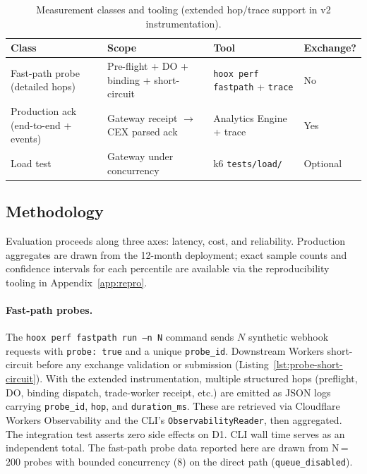 \begin{table}[t]
  \centering
  \caption{Measurement classes and tooling (extended hop/trace support in v2 instrumentation).}
  \label{tab:measurement-taxonomy}
  \small
  \begin{tabular*}{\linewidth}{@{\extracolsep{\fill}}llll@{}}
    \toprule
    \textbf{Class} & \textbf{Scope} & \textbf{Tool} & \textbf{Exchange?} \\
    \midrule
    Fast-path probe (detailed hops) & Pre-flight + DO + binding + short-circuit & \texttt{hoox perf fastpath} + \texttt{trace} & No \\
    Production ack (end-to-end + events) & Gateway receipt $\rightarrow$ CEX parsed ack & Analytics Engine + trace & Yes \\
    Load test & Gateway under concurrency & k6 \texttt{tests/load/} & Optional \\
    \bottomrule
  \end{tabular*}
\end{table}

\subsection{Methodology}

Evaluation proceeds along three axes: latency, cost, and reliability. Production aggregates are drawn from the 12-month deployment; exact sample counts and confidence intervals for each percentile are available via the reproducibility tooling in Appendix~\ref{app:repro}.

\paragraph{Fast-path probes.} The \texttt{hoox perf fastpath run --n N} command sends $N$ synthetic webhook requests with \texttt{probe: true} and a unique \texttt{probe\_id}. Downstream Workers short-circuit before any exchange validation or submission (Listing~\ref{lst:probe-short-circuit}). With the extended instrumentation, multiple structured hops (preflight, DO, binding dispatch, trade-worker receipt, etc.) are emitted as JSON logs carrying \texttt{probe\_id}, \texttt{hop}, and \texttt{duration\_ms}. These are retrieved via Cloudflare Workers Observability and the CLI's \texttt{ObservabilityReader}, then aggregated. The integration test asserts zero side effects on D1. CLI wall time serves as an independent total. The fast-path probe data reported here are drawn from N\,=\,200 probes with bounded concurrency (8) on the direct path (\texttt{queue\_disabled}).

